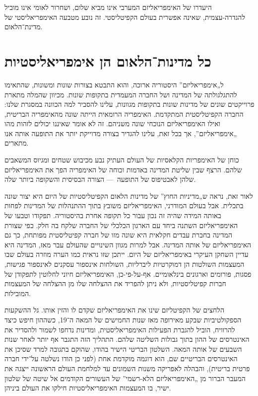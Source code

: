 היעדרו של האימפריאליזם המערבי אינו מביא שלום, ושחרור לאומי אינו מוביל להגדרה-עצמית, שאינה אפשרית בעולם הקפיטליסטי. זה נובע מטבעה האימפריאליסטי של מדינת־הלאום.



\section*{כל מדינות־הלאום הן אימפריאליסטיות}

ל„אימפריאליזם” היסטוריה ארוכה, והוא התבטא בצורות שונות ומשונות, שהתאימו להתגלגולתה של המדינה ושל החברה המעמדית בתקופות שונות. מכיוון שהמלה מתארת פרוייקטים שונים של מדינות שונות בתקופות מגוונות, עלינו להסביר למה הכוונה במסגרת שלנו: החברה הקפיטליסטית המתקדמת. האימפריה הרומאית הייתה שונה מהאימפריה הבריטית, ואילו האימפריאליזם הנוכחי שונה משניהם. זה לא אומר שאיננו יכולים לזהות מהו „אימפריאליזם”, אך בכל זאת, עלינו להגדיר בצורה מדוייקת יותר את התופעה אותה אנו מתארים.

כוחן של האימפריות הקלאסיות של העולם העתיק נבע מכיבוש שטחים ומגיוס המשאבים שלהם. הרצף שבין שליטת המדינה באדמות וכוחה של האימפריה הפך את האימפריאליזם שלהן לאבטיפוס של התופעה~— הצורה הבסיסית והשקופה ביותר שלה.

לאור זאת, נראה ש„מדיניות החוץ” של מדינות הלאום הקפיטליסטיות של היום היא יצור שונה בתכלית. אבל בעולם המודרני, האימפריאליזם משובץ בתוך ההתנהלות של המדינות לפחות באותה המידה שהיה זה נכון עבור כל תקופה אחרת בהיסטוריה. תפקודו וטבעו של האימפריאליזם השתנה ביחד עם הארגון הכלכלי של החברה שלקח בה חלק. כפי שצורת המדינה בחברת עבדים חקלאית היא שונה מזו של חברה קפיטליסטית מפותחת, כך גם האימפריאליזם של אותה המדינה. אבל למרות מגוון השינויים שהעולם עבר מאז, המדינה היא עדיין השחקן העיקרי באימפריאליזם של היום. ייתכן שזו נראית כמו הערה מוזרה בעולם שבו המעצמות השולטות הן דמוקרטיות ליברליות, השולחות אינספור עסקנים לאינספור פגישות, פסגות, פורומים וארגונים בינלאומיים. אף-על-פי-כן, האימפריאליזם חיוני לחלוטין לתפקודן של חברות קפיטליסטיות, ולא ניתן להפריד את ההצלחה שלו מן ההצלחה של המעצמות המובילות.

הלחצים של הקפיטליזם שינו את האימפריאליזם שקדם לו והזין אותו. גל ההשקעות הספקולטיביות שבקע מאירופה מאז שנות החמישים של המאה ה־19, כשההון חיפש כיצד להרוויח, הוביל להגברת הפעילות האימפריאליסטית, ומדינות נדחפו לשמור ולהסדיר את האינטרסים של ההון בתוך גבולות השליטה שלהם. התהליך הזה התגבר אף יותר לאחר שנות השבעים של אותה המאה. השלטון הבריטי הישיר בהודו, שהוקם בתגובה למרד שסיכן את האינטרסים הבריטיים שם, הוא דוגמה מוקדמת אחת (לפני כן הודו נשלטה על־ידי חברה פרטית בריטית), והבהלה לאפריקה משנות השמונים עד למלחמת העולם הראשונה ייצגה את המעבר הברור מן „האימפריאליזם הלא-רשמי” של העשורים הקודמים אל שיטה של שלטון ישיר, בו המעצמות האימפריאליסטיות חילקו את העולם ביניהן.

